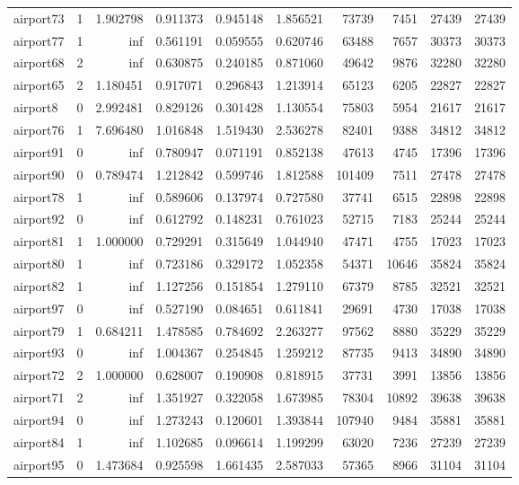 \begin{longtable}{|l|r|r|r|r|r|r|r|r|r|}
airport73 & 1 & 1.902798 & 0.911373 & 0.945148 & 1.856521 & 73739 & 7451 & 27439 & 27439 \\
airport77 & 1 & inf & 0.561191 & 0.059555 & 0.620746 & 63488 & 7657 & 30373 & 30373 \\
airport68 & 2 & inf & 0.630875 & 0.240185 & 0.871060 & 49642 & 9876 & 32280 & 32280 \\
airport65 & 2 & 1.180451 & 0.917071 & 0.296843 & 1.213914 & 65123 & 6205 & 22827 & 22827 \\
airport8 & 0 & 2.992481 & 0.829126 & 0.301428 & 1.130554 & 75803 & 5954 & 21617 & 21617 \\
airport76 & 1 & 7.696480 & 1.016848 & 1.519430 & 2.536278 & 82401 & 9388 & 34812 & 34812 \\
airport91 & 0 & inf & 0.780947 & 0.071191 & 0.852138 & 47613 & 4745 & 17396 & 17396 \\
airport90 & 0 & 0.789474 & 1.212842 & 0.599746 & 1.812588 & 101409 & 7511 & 27478 & 27478 \\
airport78 & 1 & inf & 0.589606 & 0.137974 & 0.727580 & 37741 & 6515 & 22898 & 22898 \\
airport92 & 0 & inf & 0.612792 & 0.148231 & 0.761023 & 52715 & 7183 & 25244 & 25244 \\
airport81 & 1 & 1.000000 & 0.729291 & 0.315649 & 1.044940 & 47471 & 4755 & 17023 & 17023 \\
airport80 & 1 & inf & 0.723186 & 0.329172 & 1.052358 & 54371 & 10646 & 35824 & 35824 \\
airport82 & 1 & inf & 1.127256 & 0.151854 & 1.279110 & 67379 & 8785 & 32521 & 32521 \\
airport97 & 0 & inf & 0.527190 & 0.084651 & 0.611841 & 29691 & 4730 & 17038 & 17038 \\
airport79 & 1 & 0.684211 & 1.478585 & 0.784692 & 2.263277 & 97562 & 8880 & 35229 & 35229 \\
airport93 & 0 & inf & 1.004367 & 0.254845 & 1.259212 & 87735 & 9413 & 34890 & 34890 \\
airport72 & 2 & 1.000000 & 0.628007 & 0.190908 & 0.818915 & 37731 & 3991 & 13856 & 13856 \\
airport71 & 2 & inf & 1.351927 & 0.322058 & 1.673985 & 78304 & 10892 & 39638 & 39638 \\
airport94 & 0 & inf & 1.273243 & 0.120601 & 1.393844 & 107940 & 9484 & 35881 & 35881 \\
airport84 & 1 & inf & 1.102685 & 0.096614 & 1.199299 & 63020 & 7236 & 27239 & 27239 \\
airport95 & 0 & 1.473684 & 0.925598 & 1.661435 & 2.587033 & 57365 & 8966 & 31104 & 31104 \\

\end{longtable}
